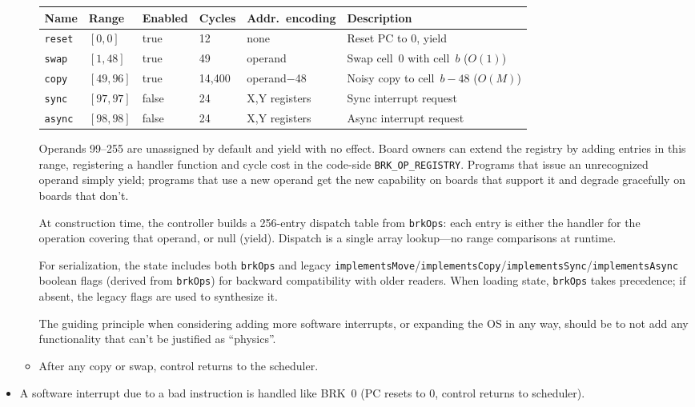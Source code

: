 \documentclass{article}
\begin{document}
\begin{itemize}
\begin{itemize}
      \begin{tabular}{l|l|l|l|l|p{}}
        Name & Range & Enabled & Cycles & Addr.\ encoding & Description \\ \hline
        \texttt{reset} & $[0, 0]$ & true & 12 & none & Reset PC to 0, yield \\
        \texttt{swap}  & $[1, 48]$ & true & 49 & operand & Swap cell~0 with cell~$b$ ($O(1)$) \\
        \texttt{copy}  & $[49, 96]$ & true & 14{,}400 & operand$-$48 & Noisy copy to cell~$b-48$ ($O(M)$) \\
        \texttt{sync}  & $[97, 97]$ & false & 24 & X,Y registers & Sync interrupt request \\
        \texttt{async} & $[98, 98]$ & false & 24 & X,Y registers & Async interrupt request
      \end{tabular}

      Operands 99--255 are unassigned by default and yield with no effect.
      Board owners can extend the registry by adding entries in this range,
      registering a handler function and cycle cost in the code-side
      \texttt{BRK\_OP\_REGISTRY}.  Programs that issue an unrecognized
      operand simply yield; programs that use a new operand get the new
      capability on boards that support it and degrade gracefully on boards
      that don't.

      At construction time, the controller builds a 256-entry dispatch table
      from \texttt{brkOps}: each entry is either the handler for the
      operation covering that operand, or null (yield).  Dispatch is a
      single array lookup---no range comparisons at runtime.

      For serialization, the state includes both \texttt{brkOps} and
      legacy \texttt{implementsMove}/\texttt{implementsCopy}/\texttt{implementsSync}/\texttt{implementsAsync}
      boolean flags (derived from \texttt{brkOps}) for backward
      compatibility with older readers.  When loading state, \texttt{brkOps}
      takes precedence; if absent, the legacy flags are used to synthesize it.

      The guiding principle when considering adding more software interrupts,
      or expanding the OS in any way, should be to not add any functionality that can't be justified as ``physics''.
    \item After any copy or swap, control returns to the scheduler.
\end{itemize}
\item A software interrupt due to a bad instruction is handled like BRK~0 (PC resets to 0, control returns to scheduler).
\end{itemize}
\end{document}
